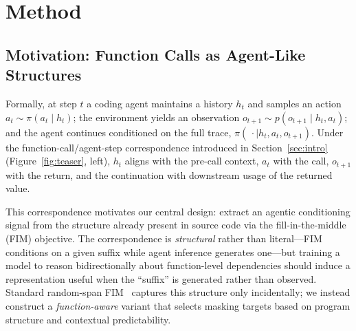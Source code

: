 
\section{Method}
\label{sec:method}

\subsection{Motivation: Function Calls as Agent-Like Structures}
\label{sec:method:motivation}

Formally, at step $t$ a coding agent maintains a history $h_t$ and samples
an action $a_t \sim \pi(a_t \mid h_t)$; the environment yields an
observation $o_{t+1} \sim p(o_{t+1} \mid h_t, a_t)$; and the agent
continues conditioned on the full trace,
$\pi(\,\cdot \mid h_t, a_t, o_{t+1})$. Under the function-call/agent-step
correspondence introduced in Section~\ref{sec:intro}
(Figure~\ref{fig:teaser}, left), $h_t$ aligns with the pre-call context,
$a_t$ with the call, $o_{t+1}$ with the return, and the continuation with
downstream usage of the returned value.

This correspondence motivates our central design: extract an agentic
conditioning signal from the structure already present in source code via
the fill-in-the-middle (FIM) objective. The correspondence is
\emph{structural} rather than literal---FIM conditions on a given suffix
while agent inference generates one---but training a model to reason
bidirectionally about function-level dependencies should induce a
representation useful when the ``suffix'' is generated rather than
observed. Standard random-span
FIM~\citep{qwencoder, deepseekcoder, starcoder} captures this
structure only incidentally; we instead construct a \emph{function-aware}
variant that selects masking targets based on program structure and
contextual predictability.

